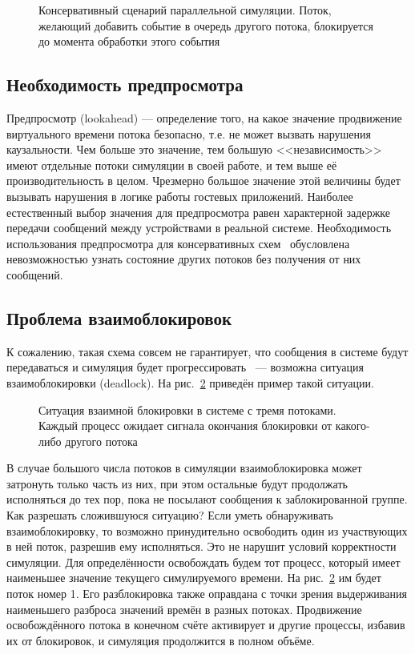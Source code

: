 \begin{figure}[htbp]
    \centering
    \caption[Консервативный сценарий параллельной симуляции]{Консервативный сценарий параллельной симуляции. Поток, желающий добавить событие в очередь другого потока, блокируется до момента обработки этого события}
    \label{fig:send-and-block}
\end{figure}


\subsection{Необходимость предпросмотра}

Предпросмотр (\abbr lookahead) — определение того, на какое значение продвижение виртуального времени потока безопасно, т.е. не может вызвать нарушения каузальности. Чем больше это значение, тем большую <<независимость>> имеют отдельные потоки симуляции в своей работе, и тем выше её производительность в целом. Чрезмерно большое значение этой величины будет вызывать нарушения в логике  работы гостевых приложений. Наиболее естественный выбор значения для предпросмотра равен характерной задержке передачи сообщений между устройствами в реальной системе. Необходимость использования предпросмотра для консервативных схем~\cite{ferscha-1995-pdes} обусловлена невозможностью узнать состояние других потоков без получения от них сообщений.

\subsection{Проблема взаимоблокировок}

К сожалению, такая схема совсем не гарантирует, что сообщения в системе будут передаваться и симуляция будет прогрессировать~\cite{Misra86distributeddiscrete-event} — возможна ситуация взаимоблокировки (\abbr deadlock). На рис.~\ref{fig:deadlock} приведён пример такой ситуации.

\begin{figure}[htbp]
    \centering
    \caption[Ситуация взаимной блокировки в системе с тремя потоками]{Ситуация взаимной блокировки в системе с тремя потоками. Каждый процесс ожидает сигнала окончания блокировки от какого-либо другого потока}
    \label{fig:deadlock}
\end{figure}

В случае большого числа потоков в симуляции взаимоблокировка может затронуть только часть из них, при этом остальные будут продолжать исполняться до тех пор, пока не посылают сообщения к заблокированной группе. Как разрешать сложившуюся ситуацию? Если уметь обнаруживать взаимоблокировку, то возможно принудительно освободить один из участвующих в ней поток, разрешив ему исполняться. Это не нарушит условий корректности симуляции. Для определённости освобождать будем тот процесс, который имеет наименьшее значение текущего симулируемого времени.  На рис.~\ref{fig:deadlock} им будет поток номер 1. Его разблокировка также оправдана с точки зрения выдерживания наименьшего разброса значений времён в разных потоках. Продвижение освобождённого потока в конечном счёте активирует и другие процессы, избавив их от блокировок, и симуляция продолжится в полном объёме.

